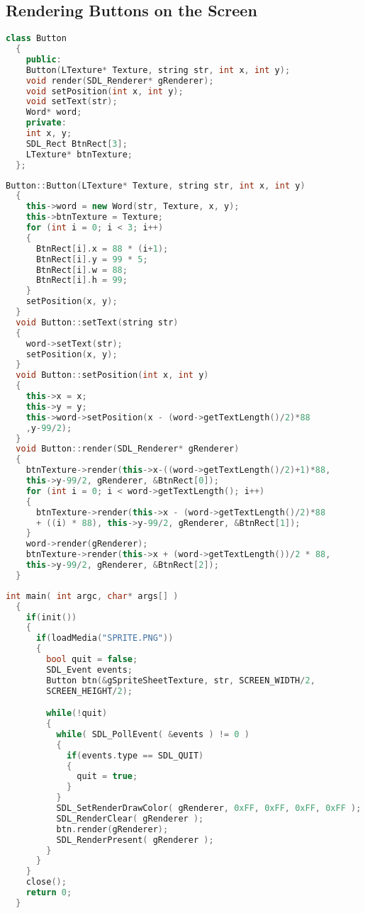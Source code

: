 \documentclass[11pt,fleqn]{book} %
\begin{document}
\subsection{Rendering Buttons on the Screen}

\begin{lstlisting}[language=C++, caption={Use of Array of Pointers and Destructors}]
  class Button
  {
    public:
    Button(LTexture* Texture, string str, int x, int y);
    void render(SDL_Renderer* gRenderer);
    void setPosition(int x, int y);
    void setText(str);
    Word* word;
    private:
    int x, y;
    SDL_Rect BtnRect[3];
    LTexture* btnTexture;
  };
\end{lstlisting}

\begin{lstlisting}[language=C++, caption={Button Methods}]
  Button::Button(LTexture* Texture, string str, int x, int y)
  {
    this->word = new Word(str, Texture, x, y);
    this->btnTexture = Texture;
    for (int i = 0; i < 3; i++)
    {
      BtnRect[i].x = 88 * (i+1);
      BtnRect[i].y = 99 * 5;
      BtnRect[i].w = 88;
      BtnRect[i].h = 99;
    }
    setPosition(x, y);
  }
  void Button::setText(string str)
  {
    word->setText(str);
    setPosition(x, y);
  }
  void Button::setPosition(int x, int y)
  {
    this->x = x;
    this->y = y;
    this->word->setPosition(x - (word->getTextLength()/2)*88
    ,y-99/2);
  }
  void Button::render(SDL_Renderer* gRenderer)
  {
    btnTexture->render(this->x-((word->getTextLength()/2)+1)*88,
    this->y-99/2, gRenderer, &BtnRect[0]);
    for (int i = 0; i < word->getTextLength(); i++)
    {
      btnTexture->render(this->x - (word->getTextLength()/2)*88
      + ((i) * 88), this->y-99/2, gRenderer, &BtnRect[1]);
    }
    word->render(gRenderer);
    btnTexture->render(this->x + (word->getTextLength())/2 * 88,
    this->y-99/2, gRenderer, &BtnRect[2]);
  }
\end{lstlisting}

\begin{lstlisting}[language=C++, caption={main() function}]
  int main( int argc, char* args[] )
  {
    if(init())
    {
      if(loadMedia("SPRITE.PNG"))
      {
        bool quit = false;
        SDL_Event events;
        Button btn(&gSpriteSheetTexture, str, SCREEN_WIDTH/2,
        SCREEN_HEIGHT/2);

        while(!quit)
        {
          while( SDL_PollEvent( &events ) != 0 )
          {
            if(events.type == SDL_QUIT)
            {
              quit = true;
            }
          }
          SDL_SetRenderDrawColor( gRenderer, 0xFF, 0xFF, 0xFF, 0xFF );
          SDL_RenderClear( gRenderer );
          btn.render(gRenderer);
          SDL_RenderPresent( gRenderer );
        }
      }
    }
    close();
    return 0;
  }
\end{lstlisting}
\end{document}
